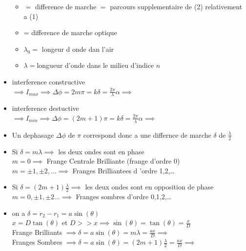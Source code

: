 \documentclass[12pt]{book}
\begin{document}
\begin{itemize}
                    \begin{itemize}
                        \item {}$ = $ difference de marche $=$ parcours supplementaire de (2) relativement a (1) 
                        \item {} = difference de marche optique 
                        \item $\lambda_0 =$ longeur d onde dan l'air 
                        \item $\lambda = $longueur d'onde dans le milieu d'indice $n$
                    \end{itemize}
                \item interference constructive \\
                    $\implies I_{max}\implies\Delta\phi=2m\pi=k\delta=\frac{2\pi}{\lambda}\alpha\implies$
                \item interference destuctive \\
                     $\implies I_{min}\implies\Delta\phi=(2m+1)\pi=k\delta=\frac{2\pi}{\lambda}\alpha\implies$
                \item Un dephasage $\Delta\phi\text{ de }\pi$ correspond donc a une differnce de marche $\delta$ de $\frac{\lambda}{2}$
                \item Si $\delta = m\lambda \implies $ les deux ondes sont en phase \\
                    $m=0 \implies$ Frange Centrale Brilliante (frange d'ordre 0) \\
                    $m = \pm 1 , \pm 2 , \ldots \implies $ Franges Brilliantees d 'ordre 1,2,\ldots
                \item Si $\delta = (2m+1)\frac{\lambda}{2} \implies $ les deux ondes sont en opposition de phase \\
                    $m = 0 ,\pm1 ,\pm2 \ldots \implies$ Franges sombres d'ordre 0,1,2,\ldots 
                \item on a $\delta = r_2 -r_1 = a\sin(\theta)$ \\
                    $x=D\tan(\theta)$ et $D >> x \implies \sin(\theta) =\tan(\theta) = \frac{x}{D}$ \\
                    Frange Brilliants $\implies \delta = a\sin(\theta) = m\lambda = \frac{ax}{D}\implies$\\
                    Franges Sombres $\implies \delta=a\sin(\theta)=(2m+1)\frac{\lambda}{2}=\frac{ax}{D}\implies $                    

                
            \end{itemize}
\end{document}

